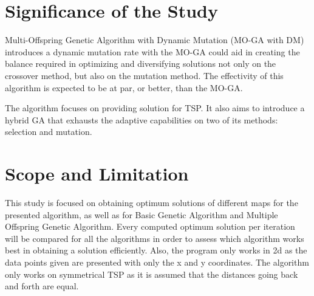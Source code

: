 \section{Significance of the Study}

\indent \indent Multi-Offspring Genetic Algorithm with Dynamic Mutation (MO-GA with DM) introduces a dynamic mutation rate with the MO-GA could aid in creating the balance required in optimizing and diversifying solutions not only on the crossover method, but also on the mutation method. The effectivity of this algorithm is expected to be at par, or better, than the MO-GA. \par 

The algorithm focuses on providing solution for TSP. It also aims to introduce a hybrid GA that exhausts the adaptive capabilities on two of its methods: selection and mutation. 

\section{Scope and Limitation}

\indent \indent 	This study is focused on obtaining optimum solutions of different maps for the presented algorithm, as well as for Basic Genetic Algorithm and Multiple Offspring Genetic Algorithm. Every computed optimum solution per iteration will be compared for all the algorithms in order to assess which algorithm works best in obtaining a solution efficiently. Also, the program only works in 2d as the data points given are presented with only the x and y coordinates. The algorithm only works on symmetrical TSP as it is assumed that the distances going back and forth are equal.




